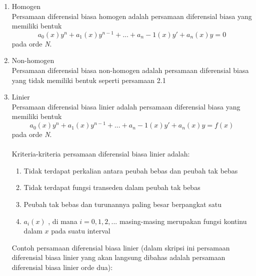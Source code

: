 \begin{enumerate}[1.]
	
	\item Homogen
	\\
	Persamaan diferensial biasa homogen adalah persamaan diferensial biasa yang memiliki bentuk \begin{equation} a_0(x)y^{n} + a_1(x)y^{n - 1} + ... + a_n-1(x)y' + a_n(x)y = 0 \end{equation}  pada orde \textit{N}.
	\\
	\item Non-homogen
	\\
	Persamaan diferensial biasa non-homogen adalah persamaan diferensial biasa yang tidak memiliki bentuk seperti persamaan 2.1
	\\
	\item Linier	
	\\
	Persamaan diferensial biasa linier adalah persamaan diferensial biasa yang memiliki bentuk \begin{equation} a_0(x)y^{n} + a_1(x)y^{n - 1} + ... + a_n-1(x)y' + a_n(x)y = f(x) \end{equation} pada orde \textit{N}.
	\\
	\\
	Kriteria-kriteria persamaan diferensial biasa linier adalah:

	\begin{enumerate}[1.]

		\item Tidak terdapat perkalian antara peubah bebas dan peubah tak bebas
		\item Tidak terdapat fungsi transeden dalam peubah tak bebas
		\item Peubah tak bebas dan turunannya paling besar berpangkat satu
		\item \begin{math} a_i(x) \end{math} , di mana \begin{math} i = 0, 1, 2, ... \end{math} masing-masing merupakan fungsi kontinu dalam \begin{math} x \end{math} pada suatu interval 

	\end{enumerate}

	Contoh persamaan diferensial biasa linier (dalam skripsi ini persamaan diferensial biasa linier yang akan langsung dibahas adalah persamaan diferensial biasa linier orde dua):


\end{enumerate}
